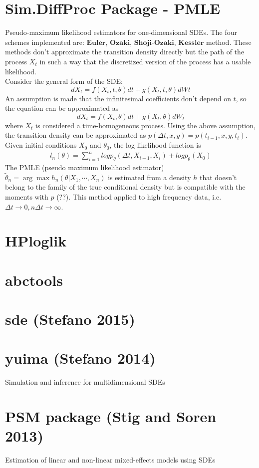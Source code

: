 \documentclass[a4paper,11pt]{article}\usepackage[]{graphicx}\usepackage[]{color}
\begin{document}
\section{Sim.DiffProc Package - PMLE}
Pseudo-maximum likelihood estimators for one-dimensional SDEs. The four schemes implemented are: $\textbf{Euler}$, $\textbf{Ozaki}$, $\textbf{Shoji-Ozaki}$, $\textbf{Kessler}$ method. These methods don't approximate the transition density directly but the path of the process $X_t$ in such a way that the discretized version of the process has a usable likelihood. \\

Consider the general form of the SDE:
\begin{equation}
dX_t = f(X_t, t, \theta)dt + g(X_t, t, \theta)dWt
\end{equation}
An assumption is made that the infinitesimal coefficients don't depend on $t$, so the equation can be approximated as
\begin{equation}
dX_t = f(X_t, \theta) dt + g(X_t, \theta)dW_t
\end{equation}
where $X_t$ is considered a time-homogeneous process. Using the above assumption, the transition density can be approximated as $p(\Delta t, x, y) = p(t_{i-1}, x, y, t_i)$. Given initial conditions $X_0$ and $\theta_0$, the log likelihood function is 
\begin{align*}
l_n (\theta) = \sum_{i=1}^{n} log p_{\theta} (\Delta t, X_{i-1}, X_i) + log p_{\theta} (X_0)
\end{align*}
The PMLE (pseudo maximum likelihood estimator) $\tilde{\theta}_n = \arg \max h_n(\theta | X_1, \cdots, X_n)$ is estimated from a density $h$ that doesn't belong to the family of the true conditional density but is compatible with the moments with $p$ (??). This method applied to high frequency data, i.e. $\Delta t \to 0, n\Delta t \to \infty$.


\section{HPloglik}

\section{abctools}

\section{sde (Stefano 2015)} 

\section{yuima (Stefano 2014)}
Simulation and inference for multidimensional SDEs

\section{PSM package (Stig and Soren 2013)}
Estimation of linear and non-linear mixed-effects models using SDEs
\end{document}
